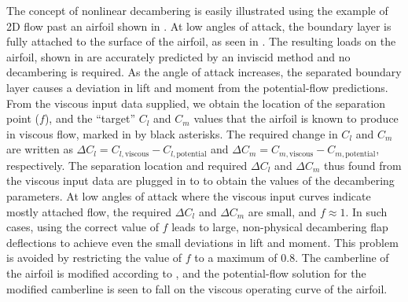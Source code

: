 The concept of nonlinear decambering is easily illustrated using the example of 2D flow past an airfoil shown in  . At low angles of attack, the boundary layer is fully attached to the surface of the airfoil, as seen in .
The resulting loads on the airfoil, shown in  are accurately predicted by an inviscid method and no decambering is required.
As the angle of attack increases, the separated boundary layer causes a deviation in lift and moment from the potential-flow predictions.
From the viscous input data supplied, we obtain the location of the separation point ($f$), and the ``target'' $C_l$ and $C_m$ values that the airfoil is known to produce in viscous flow, marked in  by black asterisks. The required change in $C_l$ and $C_m$ are written as $\Delta C_l = C_{l,\text{viscous}} - C_{l,\text{potential}}$ and $\Delta C_m = C_{m,\text{viscous}} - C_{m,\text{potential}}$, respectively. The separation location and required $\Delta C_l$ and $\Delta C_m$ thus found from the viscous input data are plugged in to  to obtain the values of the decambering parameters. At low angles of attack where the viscous input curves indicate mostly attached flow, the required $\Delta C_l$ and $\Delta C_m$ are small, and $f \approx 1$. In such cases, using the correct value of $f$ leads to large, non-physical decambering flap deflections to achieve even the small deviations in lift and moment. This problem is avoided by restricting the value of $f$ to a maximum of $0.8$. %
The camberline of the airfoil is modified according to , and the potential-flow solution for the modified camberline is seen to fall on the viscous operating curve of the airfoil.

